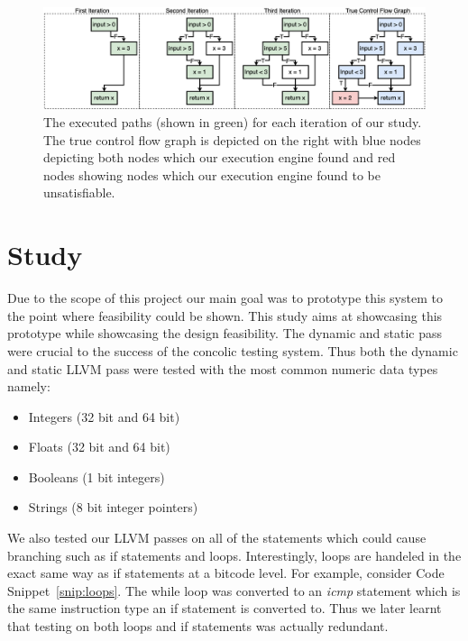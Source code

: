 \begin{figure}[t]
 \centering
 \includegraphics[width=\textwidth]{./images/cfg.png}
 \caption{The executed paths (shown in green) for each iteration of our study. The true control flow graph is depicted on the right with blue nodes depicting both nodes which our execution engine found and red nodes showing nodes which our execution engine found to be unsatisfiable.}
 \label{fig:cfg}
\end{figure}

\section{Study}

Due to the scope of this project our main goal was to prototype this system to the point where feasibility could be shown. This study aims at showcasing this prototype while showcasing the design feasibility. The dynamic and static pass were crucial to the success of the concolic testing system. Thus both the dynamic and static LLVM pass were tested with the most common numeric data types namely:

\begin{itemize}
    \item Integers (32 bit and 64 bit)
    \item Floats (32 bit and 64 bit)
    \item Booleans (1 bit integers)
    \item Strings (8 bit integer pointers)
\end{itemize}

We also tested our LLVM passes on all of the statements which could cause branching such as if statements and loops. Interestingly, loops are handeled in the exact same way as if statements at a bitcode level. For example, consider Code Snippet~\ref{snip:loops}. The while loop was converted to an \textit{icmp} statement which is the same instruction type an if statement is converted to. Thus we later learnt that testing on both loops and if statements was actually redundant.

\vspace{-0.4cm}

